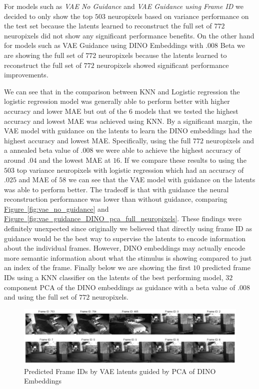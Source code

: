 \documentclass[12pt, letterpaper]{article}
\begin{document}
For models such as \textit{VAE No Guidance} and \textit{VAE Guidance using Frame ID} we decided to only show the top $503$ neuropixels based on variance performance on the test set because the latents learned to reconstruct the full set of $772$ neuropixels did not show any significant performance benefits. On the other hand for models such as VAE Guidance using DINO Embeddings with .008 Beta we are showing the full set of $772$ neuropixels because the latents learned to reconstruct the full set of $772$ neuropixels showed significant performance improvements.

We can see that in the comparison between KNN and Logistic regression the logistic regression model was generally able to perform better with higher accuracy and lower MAE but out of the $6$ models that we tested the highest accuracy and lowest MAE was achieved using KNN. By a significant margin, the VAE model with guidance on the latents to learn the DINO \cite{dino} embeddings had the highest accuracy and lowest MAE. Specifically, using the full $772$ neuropixels and a annealed beta value of $.008$ we were able to achieve the highest accuracy of around $.04$ and the lowest MAE at $16$. If we compare these results to using the $503$ top variance neuropixels with logistic regression which had an accuracy of $.025$ and MAE of $58$ we can see that the VAE model with guidance on the latents was able to perform better. The tradeoff is that with guidance the neural reconstruction performance was lower than without guidance, comparing \hyperref[fig:vae_no_guidance]{Figure~\ref{fig:vae_no_guidance}} and \hyperref[fig:vae_guidance_DINO_pca_full_neuropixels]{Figure~\ref{fig:vae_guidance_DINO_pca_full_neuropixels}}. These findings were definitely unexpected since originally we believed that directly using frame ID as guidance would be the best way to supervise the latents to encode information about the individual frames. However, DINO \cite{dino} embeddings may actually encode more semantic information about what the stimulus is showing compared to just an index of the frame. Finally below we are showing the first $10$ predicted frame IDs using a KNN classifier on the latents of the best performing model, $32$ component PCA of the DINO \cite{dino} embeddings as guidance with a beta value of $.008$ and using the full set of $772$ neuropixels.

\begin{figure}[H]
    \centering
    \includegraphics[width=1.0\textwidth]{772_vae_hidden_.9_pca_DINO_knn_video.png}
    \caption{Predicted Frame IDs by VAE latents guided by PCA of DINO Embeddings}
    \label{fig:vae_frame_id_decoded_video}
\end{figure}
\end{document}

